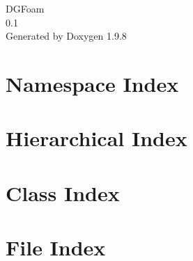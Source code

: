 \documentclass[twoside]{book}
\newcommand{\+}{\discretionary{\mbox{\scriptsize$\hookleftarrow$}}{}{}}
\newcommand{\clearemptydoublepage}{%
    \newpage{\pagestyle{empty}\cleardoublepage}%
  }
\begin{document}
  \raggedbottom
    \hypersetup{pageanchor=false,
                bookmarksnumbered=true,
                pdfencoding=unicode
               }
  \begin{titlepage}
  \vspace*{7cm}
  \begin{center}%
  {\Large DGFoam}\\
  [1ex]\large 0.\+1 \\
  \vspace*{1cm}
  {\large Generated by Doxygen 1.9.8}\\
  \end{center}
  \end{titlepage}
  \clearemptydoublepage
  \tableofcontents
  \clearemptydoublepage
  \hypersetup{pageanchor=true}

\chapter{Namespace Index}

\chapter{Hierarchical Index}

\chapter{Class Index}

\chapter{File Index}

\end{document}
